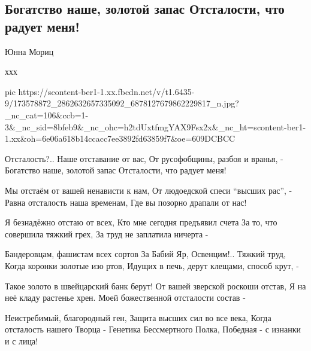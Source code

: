  
 
 
 
 

\subsection{Богатство наше, золотой запас Отсталости, что радует меня!}
\label{sec:16_04_2021.fb.grinevich_nina.1.otstalost}

Юнна Мориц

ххх

\ifcmt
  pic https://scontent-ber1-1.xx.fbcdn.net/v/t1.6435-9/173578872_2862632657335092_6878127679862229817_n.jpg?_nc_cat=106&ccb=1-3&_nc_sid=8bfeb9&_nc_ohc=h2tdUxtfmgYAX9Fsx2x&_nc_ht=scontent-ber1-1.xx&oh=6e06a618b14ccacc7ee3892fd63859f7&oe=609DCBCC
\fi

Отсталость?.. Наше отставание от вас,
От русофобщины, разбоя и вранья, -
Богатство наше, золотой запас
Отсталости, что радует меня!

Мы отстаём от вашей ненависти к нам,
От людоедской спеси \enquote{высших рас}, -
Равна отсталость наша временам,
Где вы позорно драпали от нас!

Я безнадёжно отстаю от всех,
Кто мне сегодня предъявил счета
За то, что совершила тяжкий грех, 
За труд не заплатила ничерта -

Бандеровцам, фашистам всех сортов
За Бабий Яр, Освенцим!.. Тяжкий труд,
Когда коронки золотые изо ртов,
Идущих в печь, дерут клещами, способ крут, -

Такое золото в швейцарский банк берут!
От вашей зверской роскоши отстав,
Я на неё кладу растенье хрен.
Моей божественной отсталости состав -

Неистребимый, благородный ген,
Защита высших сил во все века,
Когда отсталость нашего Творца -
Генетика Бессмертного Полка,
Победная - с изнанки и с лица!
